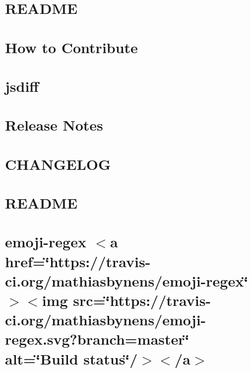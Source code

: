 \let\mypdfximage\pdfximage\def\pdfximage{\immediate\mypdfximage}\documentclass[twoside]{book}
\newcommand{\+}{\discretionary{\mbox{\scriptsize$\hookleftarrow$}}{}{}}
\begin{document}
\chapter{R\+E\+A\+D\+ME}
\label{md_heap-visualizer_node_modules_define-properties__r_e_a_d_m_e}

\chapter{How to Contribute}
\label{md_heap-visualizer_node_modules_diff__c_o_n_t_r_i_b_u_t_i_n_g}

\chapter{jsdiff}
\label{md_heap-visualizer_node_modules_diff__r_e_a_d_m_e}

\chapter{Release Notes}
\label{md_heap-visualizer_node_modules_diff_release-notes}

\chapter{C\+H\+A\+N\+G\+E\+L\+OG}
\label{md_heap-visualizer_node_modules_doctrine__c_h_a_n_g_e_l_o_g}

\chapter{R\+E\+A\+D\+ME}
\label{md_heap-visualizer_node_modules_doctrine__r_e_a_d_m_e}

\chapter{emoji-\/regex $<$a href=\char`\"{}https\+://travis-\/ci.\+org/mathiasbynens/emoji-\/regex\char`\"{}$>$$<$img src=\char`\"{}https\+://travis-\/ci.\+org/mathiasbynens/emoji-\/regex.\+svg?branch=master\char`\"{} alt=\char`\"{}\+Build status\char`\"{}/$>$$<$/a$>$}
\label{md_heap-visualizer_node_modules_emoji-regex__r_e_a_d_m_e}

\end{document}
